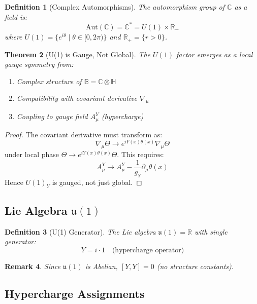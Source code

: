 \documentclass[12pt]{article}
\newtheorem{definition}{Definition}[section]
\newtheorem{theorem}[definition]{Theorem}
\newtheorem{remark}[definition]{Remark}
\newcommand{\B}{\mathbb{B}}
\newcommand{\C}{\mathbb{C}}
\newcommand{\R}{\mathbb{R}}
\renewcommand{\H}{\mathbb{H}}
\newcommand{\uu}{\mathfrak{u}}
\newcommand{\Aut}{\mathrm{Aut}}
\begin{document}
\begin{definition}[Complex Automorphisms]
The automorphism group of $\C$ as a field is:
\begin{equation}
\Aut(\C) = \C^* = U(1) \times \R_+
\end{equation}
where $U(1) = \{e^{i\theta} \mid \theta \in [0,2\pi)\}$ and $\R_+ = \{r > 0\}$.
\end{definition}

\begin{theorem}[U(1) is Gauge, Not Global]
The $U(1)$ factor emerges as a \emph{local} gauge symmetry from:
\begin{enumerate}
\item Complex structure of $\B = \C \otimes \H$
\item Compatibility with covariant derivative $\nabla_\mu$
\item Coupling to gauge field $A_\mu^Y$ (hypercharge)
\end{enumerate}
\end{theorem}

\begin{proof}
The covariant derivative must transform as:
\begin{equation}
\nabla_\mu \Theta \to e^{iY(x)\theta(x)} \nabla_\mu \Theta
\end{equation}
under local phase $\Theta \to e^{iY(x)\theta(x)} \Theta$. This requires:
\begin{equation}
A_\mu^Y \to A_\mu^Y - \frac{1}{g_Y} \partial_\mu \theta(x)
\end{equation}
Hence $U(1)_Y$ is gauged, not just global.
\end{proof}

\subsection{Lie Algebra $\uu(1)$}

\begin{definition}[U(1) Generator]
The Lie algebra $\uu(1) = \R$ with single generator:
\begin{equation}
Y = i \cdot 1 \quad \text{(hypercharge operator)}
\end{equation}
\end{definition}

\begin{remark}
Since $\uu(1)$ is Abelian, $[Y,Y] = 0$ (no structure constants).
\end{remark}

\subsection{Hypercharge Assignments}
\end{document}
